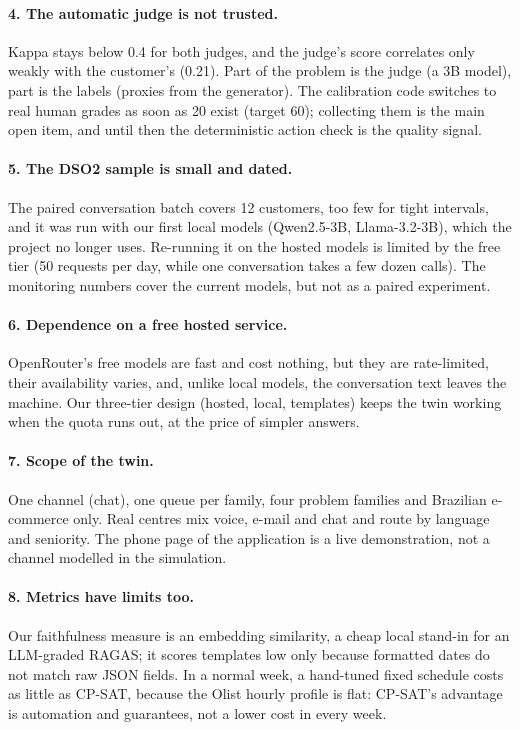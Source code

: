 \paragraph{4. The automatic judge is not trusted.} Kappa stays below 0.4 for both judges, and the judge's score
correlates only weakly with the customer's (0.21). Part of the problem is the judge (a 3B model), part is the
labels (proxies from the generator). The calibration code switches to real human grades as soon as 20 exist
(target 60); collecting them is the main open item, and until then the deterministic action check is the
quality signal.

\paragraph{5. The DSO2 sample is small and dated.} The paired conversation batch covers 12 customers, too few
for tight intervals, and it was run with our first local models (Qwen2.5-3B, Llama-3.2-3B), which the project
no longer uses. Re-running it on the hosted models is limited by the free tier (50 requests per day, while one
conversation takes a few dozen calls). The monitoring numbers cover the current models, but not as a paired
experiment.

\paragraph{6. Dependence on a free hosted service.} OpenRouter's free models are fast and cost nothing, but they
are rate-limited, their availability varies, and, unlike local models, the conversation text leaves the
machine. Our three-tier design (hosted, local, templates) keeps the twin working when the quota runs out, at
the price of simpler answers.

\paragraph{7. Scope of the twin.} One channel (chat), one queue per family, four problem families and Brazilian
e-commerce only. Real centres mix voice, e-mail and chat and route by language and seniority. The phone page
of the application is a live demonstration, not a channel modelled in the simulation.

\paragraph{8. Metrics have limits too.} Our faithfulness measure is an embedding similarity, a cheap local
stand-in for an LLM-graded RAGAS; it scores templates low only because formatted dates do not match raw JSON
fields. In a normal week, a hand-tuned fixed schedule costs as little as CP-SAT, because the Olist hourly
profile is flat: CP-SAT's advantage is automation and guarantees, not a lower cost in every week.

